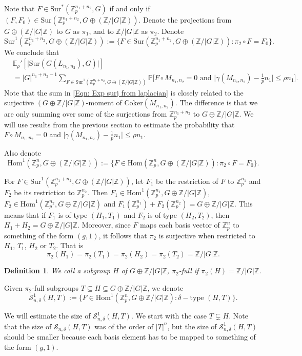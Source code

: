 \documentclass[12pt]{amsart}
\newtheorem{definition}[theorem]{Definition}
\theoremstyle{definition}
\newcommand{\PPP}{\mathbb{P}}
\newcommand{\SSS}[3]{\mathcal{S}_{#1}(#2,#3)}
\newcommand{\SSO}[3]{\mathcal{S}^1_{#1}(#2,#3)}
\newcommand{\Mnot}{M_{n_1,n_2}}
\newcommand{\Lnot}{L_{n_1,n_2}}
\newcommand{\Erhop}{\E_{\rho}'}
\newcommand{\ZG}{\Z/\abs{G}\Z}
\newcommand{\abs}[1]{\vert#1\vert}
\newcommand{\Zpn}{\Z_p^{n}}
\newcommand{\Zpnot}{\Z_p^{n_1+n_2}}
\newcommand{\Zp}{\Z_p}
\newcommand{\E}{\mathbb{E}}
\newcommand{\Z}{\mathbb{Z}}
\newcommand{\Coker}{\text{Coker}}
\newcommand{\Hom}{\text{Hom}}
\newcommand{\Sur}{\text{Sur}}
\begin{document}
Note that $F\in \Sur^*(\Zpnot,G)$ if and only if $(F,F_0)\in \Sur(\Zpnot,G\oplus (\ZG))$.
Denote the projections from $G\oplus (\ZG)$ to $G$ as $\pi_1$, and to $\ZG$ as $\pi_2$.
Denote
\[
\Sur^1(\Zpnot,G\oplus(\ZG))
:=\{F\in \Sur(\Zpnot,G\oplus(\ZG)) : \pi_2\circ F=F_0\}.
\]
We conclude that
\begin{equation}\label{Eqn: Exp surj from laplacian}
\begin{split}
&\Erhop[\abs{\Sur(G(\Lnot),G)}]\\
&=\abs{G}^{n_1+n_2-1}\!\!\!\!\!\!\!\!\!\!\!\! \sum_{F\in\Sur^1(\Zpnot,G\oplus (\ZG))}\!\!\!\!\!\!\!\!\!\!\!\!
\PPP\Big[F\circ \Mnot=0 \text{ and }\abs{\gamma(\Mnot) -\tfrac{1}{p} n_1}\leq \rho n_1\Big].
\end{split}
\end{equation}
Note that the sum in \eqref{Eqn: Exp surj from laplacian} is closely related to the surjective $(G\oplus \ZG)$-moment of $\Coker(\Mnot)$.
The difference is that we are only summing over some of the surjections from $\Zpnot$ to $G\oplus \ZG$.
We will use results from the previous section to estimate the probability that $F\circ \Mnot=0$ and $\abs{\gamma(\Mnot) -\tfrac{1}{p} n_1}\leq \rho n_1$.


Also denote
\[
\Hom^1(\Zpn,G\oplus(\ZG))
:=\{F\in \Hom(\Zpn,G\oplus(\ZG)) : \pi_2\circ F=F_0\}.
\]

For $F\in \Sur^1(\Zpnot,G\oplus(\ZG))$, let $F_1$ be the restriction of $F$ to $\Zp^{n_1}$ and $F_2$ be its restriction to $\Zp^{n_2}$. Then $F_1\in \Hom^1(\Zp^{n_1},G\oplus \ZG)$, $F_2\in \Hom^1(\Zp^{n_2},G\oplus \ZG)$ and $F_1(\Zp^{n_1}) +F_2(\Zp^{n_2})=G\oplus \ZG$.
This means that if $F_1$ is of type $(H_1,T_1)$ and $F_2$ is of type $(H_2,T_2)$, then $H_1+H_2=G\oplus \ZG$.
Moreover, since $F$ maps each basis vector of $\Zpn$ to something of the form $(g,1)$, it follows that $\pi_2$ is surjective when restricted to $H_1$, $T_1$, $H_2$ or $T_2$. That is
\[
\pi_2(H_1) =\pi_2(T_1) =
\pi_2(H_2) =\pi_2(T_2) =\ZG.
\]

\begin{definition}
We call a subgroup $H$ of $G\oplus \ZG$, $\pi_2$-full if $\pi_2(H)=\ZG$.
\end{definition}
Given $\pi_2$-full subgroups $T\subseteq H\subseteq G\oplus \ZG$, we denote
\[
\SSO{n,\delta}{H}{T}
:=\{F\in \Hom^1(\Zp^n,G\oplus\ZG): \delta-\text{type }(H,T)\}.
\]

We will estimate the size of $\SSO{n,\delta}{H}{T}$. We start with the case $T\subsetneq H$.
Note that the size of $\SSS{n,\delta}{H}{T}$ was of the order of $\abs{T}^n$, but the size of $\SSO{n,\delta}{H}{T}$ should be smaller because each basis element has to be mapped to something of the form $(g,1)$.
\end{document}
